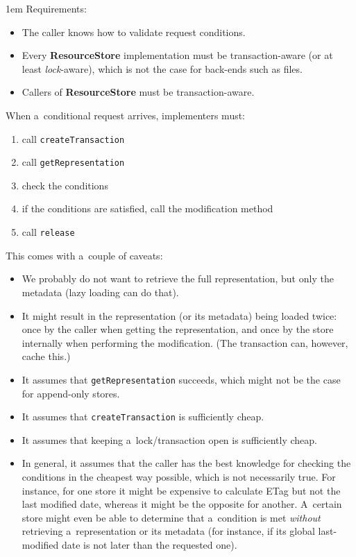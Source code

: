\documentclass[10pt]{article}
\newenvironment{Note}
  {\begin{multicols}{3}%
     \parskip 1em}
  {\end{multicols}}
\begin{document}
\begin{Note}
Requirements:
\begin{itemize}
  \item The caller knows how to validate request conditions.

  \item Every \textbf{ResourceStore} implementation must be transaction-aware
        (or at least \emph{lock}-aware),
        which is not the case for back-ends such as files.

  \item Callers of \textbf{ResourceStore} must be transaction-aware.
\end{itemize}

\bigskip
When a~conditional request arrives, implementers must:
\begin{enumerate}
  \item call \verb!createTransaction!
  \item call \verb!getRepresentation!
  \item check the conditions
  \item if the conditions are satisfied, call the modification method
  \item call \verb!release!
\end{enumerate}

\bigskip
This comes with a~couple of caveats:
\begin{itemize}
  \item We probably do not want to retrieve the full representation,
        but only the metadata (lazy loading can do that).

  \item It might result in the representation (or its metadata)
        being loaded twice:
        once by the caller when getting the representation,
        and once by the store internally when performing the modification.
        (The transaction can, however, cache this.)

  \item It assumes that \verb!getRepresentation! succeeds,
        which might not be the case for append-only stores.

  \item It assumes that \verb!createTransaction! is sufficiently cheap.

  \item It assumes that keeping a~lock/transaction open is sufficiently cheap.

  \item In general,
        it assumes that the caller has the best knowledge
        for checking the conditions in the cheapest way possible,
        which is not necessarily true.
        For instance,
        for one store it might be expensive to calculate ETag
        but not the last modified date,
        whereas it might be the opposite for another.
        A~certain store might even be able to determine
        that a~condition is met \emph{without} retrieving
        a~representation or its metadata
        (for instance, if its global last-modified date
         is not later than the requested one).
\end{itemize}


\end{Note}
\end{document}
